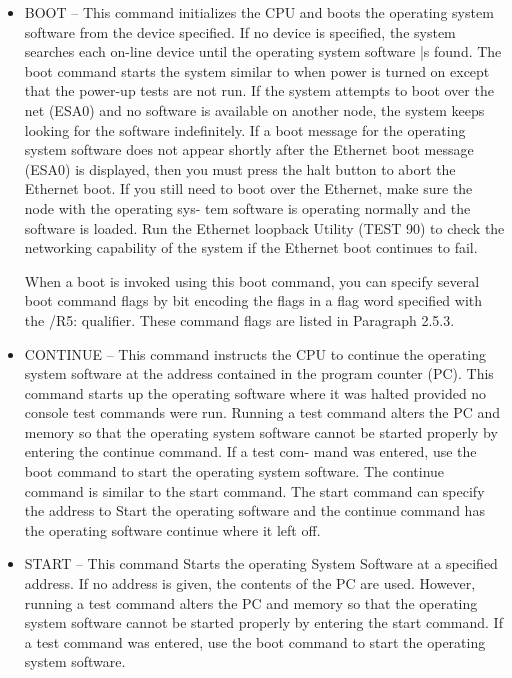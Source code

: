\begin{itemize}
\item BOOT -- This command initializes the CPU and boots the operating 
system software from the device specified. If no device is specified, the
system searches each on-line device until the operating system software
|s found. The boot command starts the system similar to when power
is turned on except that the power-up tests are not run. If the system
attempts to boot over the net (ESA0) and no software is available on
another node, the system keeps looking for the software indefinitely.
If a boot message for the operating system software does not appear
shortly after the Ethernet boot message (ESA0) is displayed, then you
must press the halt button to abort the Ethernet boot. If you still need
to boot over the Ethernet, make sure the node with the operating sys-
tem software is operating normally and the software is loaded. Run the
Ethernet loopback Utility (TEST 90) to check the networking capability
of the system if the Ethernet boot continues to fail.

When a boot is invoked using this boot command, you can specify
several boot command flags by bit encoding the flags in a flag word
specified with the /R5: qualifier. These command flags are listed in
Paragraph 2.5.3.

\item CONTINUE -- This command instructs the CPU to continue the 
operating system software at the address contained in the program counter
(PC). This command starts up the operating software where it was halted
provided no console test commands were run. Running a test command
alters the PC and memory so that the operating system software cannot
be started properly by entering the continue command. If a test com-
mand was entered, use the boot command to start the operating system
software. The continue command is similar to the start command. The
start command can specify the address to Start the operating software
and the continue command has the operating software continue where
it left off.

\item START -- This command Starts the operating System Software at a 
specified address. If no address is given, the contents of the PC are used.
However, running a test command alters the PC and memory so that the
operating system software cannot be started properly by entering the
start command. If a test command was entered, use the boot command
to start the operating system software.

\end{itemize}

